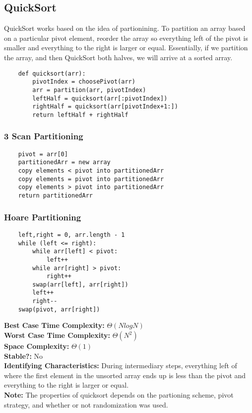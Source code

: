 \documentclass{article}
\begin{document}
\subsection{QuickSort}
QuickSort works based on the idea of partionining. To partition an array based on a particular pivot element,
reorder the array so everything left of the pivot is smaller and everything to the right is larger or equal.
Essentially, if we partition the array, and then QuickSort both halves, we will arrive at a sorted array.
\begin{lstlisting}
    def quicksort(arr):
        pivotIndex = choosePivot(arr)
        arr = partition(arr, pivotIndex)
        leftHalf = quicksort(arr[:pivotIndex])
        rightHalf = quicksort(arr[pivotIndex+1:])
        return leftHalf + rightHalf
\end{lstlisting}
\subsubsection{3 Scan Partitioning}
\begin{lstlisting}
    pivot = arr[0]
    partitionedArr = new array
    copy elements < pivot into partitionedArr
    copy elements = pivot into partitionedArr
    copy elements > pivot into partitionedArr
    return partitionedArr
\end{lstlisting}
\subsubsection{Hoare Partitioning}
\begin{lstlisting}
    left,right = 0, arr.length - 1
    while (left <= right):
        while arr[left] < pivot:
            left++
        while arr[right] > pivot:
            right++
        swap(arr[left], arr[right])
        left++
        right--
    swap(pivot, arr[right])
\end{lstlisting}
\textbf{Best Case Time Complexity:  } $\Theta(NlogN)$\\
\textbf{Worst Case Time Complexity: } $\Theta(N^2)$\\
\textbf{Space Complexity: } $\Theta(1)$\\
\textbf{Stable?: } No\\
\textbf{Identifying Characteristics: } During intermediary steps, everything left of where the first element in the unsorted array
ends up is less than the pivot and everything to the right is larger or equal.\\
\textbf{Note: } The properties of quicksort depends on the partioning scheme, pivot strategy, and whether or not randomization was used.
\end{document}
